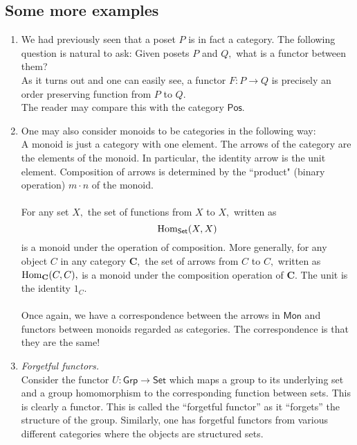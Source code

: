 \subsection{Some more examples}
\begin{enumerate}
	\item We had previously seen that a poset $P$ is in fact a category. The following question is natural to ask: Given posets $P$ and $Q,$ what is a functor between them?\\
	As it turns out and one can easily see, a functor $F:P\to Q$ is precisely an order preserving function from $P$ to $Q.$\\
	The reader may compare this with the category $\mathsf{Pos}.$
	\item One may also consider monoids to be categories in the following way:\\
	A monoid is just a category with one element. The arrows of the category are the elements of the monoid. In particular, the identity arrow is the unit element. Composition of arrows is determined by the ``product" (binary operation) $m\cdot n$ of the monoid.\\~\\
	For any set $X,$ the set of functions from $X$ to $X,$ written as
	\begin{equation*} 
		\operatorname{Hom}_{\mathsf{Set}}(X, X)
	\end{equation*}
	is a monoid under the operation of composition. More generally, for any object $C$ in any category $\mathbf{C},$ the set of arrows from $C$ to $C,$ written as $\operatorname{Hom}_\mathbf{C}(C, C),$ is a monoid under the composition operation of $\mathbf{C}.$ The unit is the identity $1_C.$\\~\\
	Once again, we have a correspondence between the arrows in $\mathsf{Mon}$ and functors between monoids regarded as categories. The correspondence is that they are the same!
	\item \emph{Forgetful functors.}\\
	Consider the functor $U:\mathsf{Grp} \to \mathsf{Set}$ which maps a group to its underlying set and a group homomorphism to the corresponding function between sets. This is clearly a functor. This is called the ``forgetful functor'' as it ``forgets'' the structure of the group. Similarly, one has forgetful functors from various different categories where the objects are structured sets.
\end{enumerate}
